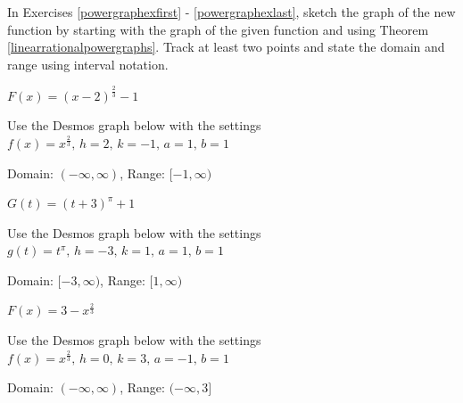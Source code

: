 \documentclass{ximera}
\begin{document}
	\author{Stitz-Zeager}

\begin{question}
In Exercises \ref{powergraphexfirst} - \ref{powergraphexlast},  sketch the graph of the new function by starting with the graph of the given function and using Theorem \ref{linearrationalpowergraphs}.   Track at least two points and state the domain and range using interval notation.


\begin{problem}\label{powergraphexfirst} $F(x) = (x-2)^{\frac{2}{3}}-1$  

\begin{solution}
Use the Desmos graph below with the settings $f(x)=x^\frac{2}{3},\,h=2,\,k=-1,\,a=1,\,b=1$

\begin{center} 
\end{center}

Domain:  $(-\infty, \infty)$, Range: $[-1, \infty)$

\end{solution} 
\end{problem}



\begin{problem} $G(t) = (t+3)^{\pi} +1$ 

\begin{solution}
Use the Desmos graph below with the settings $g(t)=t^\pi,\,h=-3,\,k=1,\,a=1,\,b=1$

\begin{center} 
\end{center}

Domain:  $[-3, \infty)$, Range: $[1, \infty)$

\end{solution} 
\end{problem}

\begin{problem} $F(x) = 3-x^{\frac{2}{3}}$ 

\begin{solution}
Use the Desmos graph below with the settings $f(x)=x^\frac{2}{3},\,h=0,\,k=3,\,a=-1,\,b=1$

\begin{center} 
\end{center}

Domain:  $(-\infty, \infty)$, Range: $(-\infty,3]$


\end{solution}
\end{problem}
\end{question}
\end{document}
